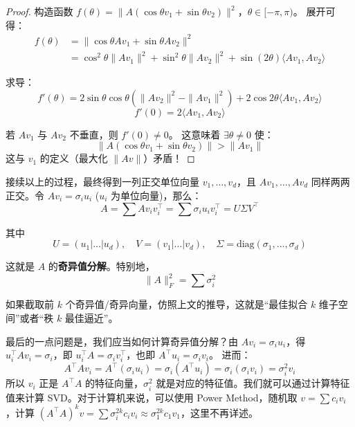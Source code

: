 \begin{proof}
    构造函数 $f(\theta) = \| A(\cos\theta v_1 + \sin\theta v_2) \|^2$，$\theta \in [-\pi, \pi)$。
    展开可得：
    \begin{align*}
        f(\theta) &= \| \cos\theta Av_1 + \sin\theta Av_2 \|^2 \\
        &= \cos^2\theta \|Av_1\|^2 + \sin^2\theta \|Av_2\|^2 + \sin(2\theta) \langle Av_1, Av_2 \rangle
    \end{align*}
    
    求导：
    \[
        f'(\theta) = 2\sin\theta\cos\theta (\|Av_2\|^2 - \|Av_1\|^2) + 2\cos 2\theta \langle Av_1, Av_2 \rangle
    \]
    \[
        f'(0) = 2 \langle Av_1, Av_2 \rangle
    \]
    
    若 $Av_1$ 与 $Av_2$ 不垂直，则 $f'(0) \neq 0$。
    这意味着 $\exists \theta \neq 0$ 使：
    \[
        \| A(\cos\theta v_1 + \sin\theta v_2) \| > \|Av_1\|
    \]
    这与 $v_1$ 的定义（最大化 $\|Av\|$）矛盾！
\end{proof}

接续以上的过程，最终得到一列正交单位向量 $v_1, \dots, v_d$，且 $Av_1, \dots, Av_d$ 同样两两正交。令 $Av_i = \sigma_i u_i$ ($u_i$ 为单位向量)，那么：
\[
    A = \sum Av_i v_i^\top = \sum \sigma_i u_i v_i^\top = U \Sigma V^\top
\]

其中
\[
    U = (u_1 | \dots | u_d), \quad V = (v_1 | \dots | v_d), \quad \Sigma = \text{diag}(\sigma_1, \dots, \sigma_d)
\]

这就是 $A$ 的\textbf{奇异值分解}。特别地，
\[
    \|A\|_F^2 = \sum \sigma_i^2
\]

如果截取前 $k$ 个奇异值/奇异向量，仿照上文的推导，这就是“最佳拟合 $k$ 维子空间”或者“秩 $k$ 最佳逼近”。

最后的一点问题是，我们应当如何计算奇异值分解？由 $Av_i = \sigma_i u_i$，得 $u_i^\top A v_i = \sigma_i$，即 $u_i^\top A = \sigma_i v_i^\top$，也即 $A^\top u_i = \sigma_i v_i$。
进而：
\[
    A^\top A v_i = A^\top (\sigma_i u_i) = \sigma_i (A^\top u_i) = \sigma_i (\sigma_i v_i) = \sigma_i^2 v_i
\]
所以 $v_i$ 正是 $A^\top A$ 的特征向量，$\sigma_i^2$ 就是对应的特征值。我们就可以通过计算特征值来计算 SVD。对于计算机来说，可以使用 Power Method，随机取 $v = \sum c_i v_i$，计算 $(A^\top A)^k v = \sum \sigma_i^{2k} c_i v_i \approx \sigma_1^{2k} c_1 v_1$，这里不再详述。